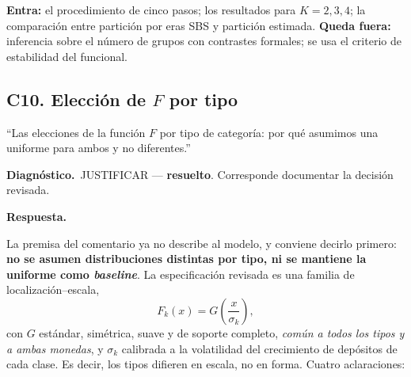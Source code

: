 \documentclass[11pt]{article}
\newcommand{\diag}[1]{\par\noindent\textbf{Diagn\'ostico.}\ #1\par}
\newcommand{\resp}{\par\noindent\textbf{Respuesta.}\par}
\theoremstyle{definition}
\begin{document}
\begin{ie2}
\textbf{Entra:} el procedimiento de cinco pasos; los resultados para $K=2,3,4$;
la comparaci\'on entre partici\'on por eras SBS y partici\'on estimada.
\textbf{Queda fuera:} inferencia sobre el n\'umero de grupos con contrastes
formales; se usa el criterio de estabilidad del funcional.
\end{ie2}

\subsection{C10. Elecci\'on de $F$ por tipo}\label{sub:C10}

\begin{jurado}
``Las elecciones de la funci\'on $F$ por tipo de categor\'ia: por qu\'e asumimos una
uniforme para ambos y no diferentes.''
\end{jurado}

\diag{JUSTIFICAR --- \textbf{resuelto}. Corresponde documentar la decisi\'on
revisada.}

\resp
La premisa del comentario ya no describe al modelo, y conviene decirlo primero:
\textbf{no se asumen distribuciones distintas por tipo, ni se mantiene la
uniforme como \emph{baseline}}. La especificaci\'on revisada es una familia de
localizaci\'on--escala,
\begin{equation}
F_k(x)=G\!\left(\frac{x}{\sigma_k}\right),
\label{eq:locscale2}
\end{equation}
con $G$ est\'andar, sim\'etrica, suave y de soporte completo, \emph{com\'un a todos
los tipos y a ambas monedas}, y $\sigma_k$ calibrada a la volatilidad del
crecimiento de dep\'ositos de cada clase. Es decir, los tipos difieren en escala,
no en forma. Cuatro aclaraciones:
\end{document}
